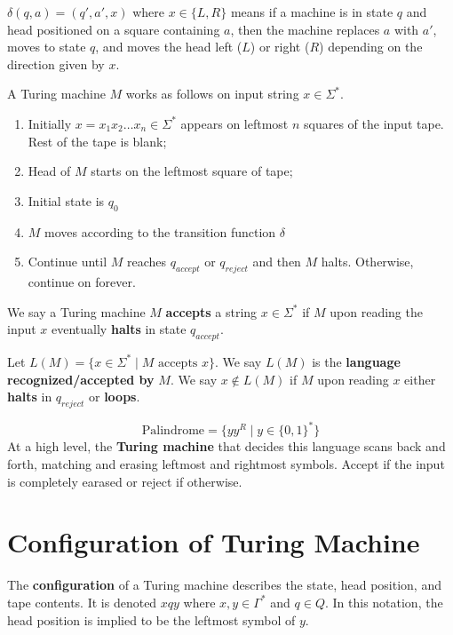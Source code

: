 $\delta(q,a) = (q',a',x)$ where $x \in \{L,R\}$ means if a machine is in state $q$ and head positioned on a square containing $a$, then the machine replaces $a$ with $a'$, moves to state $q$, and moves the head left ($L$) or right ($R$) depending on the direction given by $x$.

A Turing machine $M$ works as follows on input string $x \in \Sigma^*$.
\begin{enumerate}
    \item Initially $x = x_1x_2\ldots x_n \in \Sigma^*$ appears on leftmost $n$ squares of the input tape. Rest of the tape is blank;
    \item Head of $M$ starts on the leftmost square of tape;
    \item Initial state is $q_0$ 
    \item $M$ moves according to the transition function $\delta$
    \item Continue until $M$ reaches $q_{accept}$ or $q_{reject}$ and then $M$ halts. Otherwise, continue on forever.
\end{enumerate}

\begin{definition}
    We say a Turing machine $M$ \textbf{accepts} a string $x \in \Sigma^*$ if $M$ upon reading the input $x$ eventually \textbf{halts} in state $q_{accept}$.

    Let $L(M) = \{x \in \Sigma^* \mid \text{$M$ accepts $x$} \}$. We say $L(M)$ is the \textbf{language recognized/accepted by} $M$. We say $x \not\in L(M)$ if $M$ upon reading $x$ either \textbf{halts} in $q_{reject}$ or \textbf{loops}.
\end{definition}

\begin{example}[Palindrome]
    $$\mathrm{Palindrome} = \{yy^R \mid y \in \{0,1\}^*\}$$
    At a high level, the \textbf{Turing machine} that decides this language scans back and forth, matching and erasing leftmost and rightmost symbols. Accept if the input is completely earased or reject if otherwise.
\end{example}

\section{Configuration of Turing Machine}

The \textbf{configuration} of a Turing machine describes the state, head position, and tape contents. It is denoted $x q y$ where $x,y \in \Gamma^*$ and $q \in  Q$. In this notation, the head position is implied to be the leftmost symbol of $y$.

